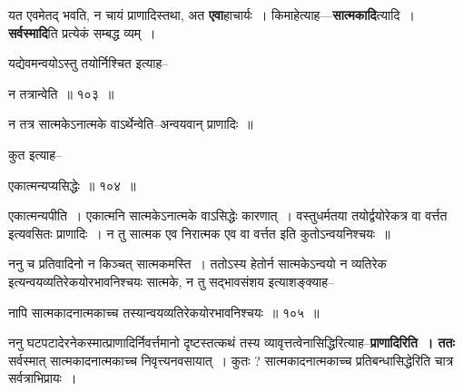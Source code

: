 \documentclass[article,12pt,a4paper]{memoir}
\begin{document}
	  \pstart यत एवमेतद् भवति, न चायं प्राणादिस्तथा, अत \textbf{एवा}हाचार्यः । किमाहेत्याह—\textbf{सात्मकादि}त्यादि । \textbf{सर्वस्मादि}ति प्रत्येकं सम्बद्ध  व्यम् ।
	\pend
	  \bigskip
	  \begingroup
	

	  \pstart यद्येवमन्वयोऽस्तु तयोर्निश्चित इत्याह--
	\pend
        
	  \bigskip
	  \begingroup
	

	  \pstart न तत्रान्वेति ॥ १०३ ॥
	\pend
      
	  \endgroup
	 

	  \pstart न तत्र सात्मकेऽनात्मके वाऽर्थेन्वेति--अन्वयवान् प्राणादिः ॥
	\pend
        

	  \pstart कुत इत्याह--
	\pend
        
	  \bigskip
	  \begingroup
	

	  \pstart एकात्मन्यप्यसिद्धेः ॥ १०४ ॥
	\pend
      
	  \endgroup
	 

	  \pstart {}एकात्मन्यपीति । एकात्मनि सात्मकेऽनात्मके वाऽसिद्धेः कारणात् । वस्तुधर्मतया तयोर्द्वयोरेकत्र वा वर्त्तत इत्यवसितः प्राणादिः । न तु सात्मक एव निरात्मक एव वा वर्त्तत इति कुतोऽन्वयनिश्चयः ॥
	\pend
        

	  \pstart ननु च प्रतिवादिनो न किञ्चत् सात्मकमस्ति । ततोऽस्य हेतोर्न सात्मकेऽन्वयो न व्यतिरेक इत्यन्वयव्यतिरेकयोरभावनिश्चयः सात्मके, न तु सद्भावसंशय इत्याशङ्क्याह--
	\pend
        
	  \bigskip
	  \begingroup
	

	  \pstart नापि सात्मकादनात्मकाच्च तस्यान्वयव्यतिरेकयोरभावनिश्चयः ॥ १०५ ॥
	\pend
      
	  \endgroup
	
	  \endgroup
	

	  \pstart ननु घटपटादेरनेकस्मात्प्राणादिर्निवर्त्तमानो दृष्टस्तत्कथं तस्य व्यावृत्तत्वेनासिद्धिरित्याह--\textbf{प्राणादिरिति । ततः} सर्वस्मात् सात्मकादनात्मकाच्च निवृत्त्यनवसायात् । कुतः ? सात्मकादनात्मकाच्च प्रतिबन्धासिद्धेरिति चात्र सर्वत्राभिप्रायः ।
	\pend
      
\end{document}
